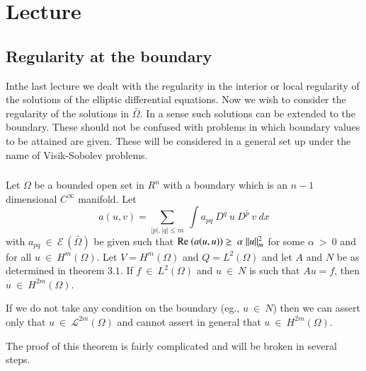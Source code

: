 
\chapter{Lecture}\label{lec15} %

\setcounter{section}{8}

\section{Regularity at the boundary}\label{lec15:sec9} %

In\pageoriginale the last lecture we dealt with the regularity in the interior or
local regularity of the solutions of the elliptic differential
equations. Now we wish to consider the regularity of the solutions in
$\bar{\Omega}$. In a sense such solutions can be extended to the
boundary. These should not be confused with problems in which boundary
values to be attained are given. These will be considered in a general
set up under the name of Visik-Sobolev problems. 

\subsection{}\label{lec15:sec9:subsec1}  %

\begin{theorem}\label{lec15:sec9:subsec1:thm9.1} %
Let $\Omega$ be a bounded open set in $R^n$ with a boundary which is
an $n-1$ dimensional $C^\infty$ manifold. Let 
$$
a(u,v) = \sum_{|p|,|q|\le m} ~\int  a_{pq} ~ D^q ~ u ~ \overline{D^p ~ v} ~ dx
$$
with $a_{pq} ~ \in ~ \mathscr{E} ~ (\bar{\Omega})$ be given
such that $\operatorname{Re}  ~ (a(u,u)) \ge ~ \alpha ~ || u ||^2_m$ for some
$\alpha ~ > ~ 0$ and for all $u ~ \in ~ H^m (\Omega)$. Let $V
= H^m (\Omega)$ and $Q = L^2 (\Omega)$ and let $A$ and $N$ be as
determined in theorem $3.1$. If $f ~ \in ~ L^2(\Omega)$ and $u
~ \in ~ N$ is such that $Au = f$, then $u ~ \in ~
H^{2m}(\Omega)$.  
\end{theorem}

\begin{remark*}%
  If we do not take any condition on the boundary (eg., $u ~ \in
  ~ N$) then we can assert only that $u ~ \in ~
  \mathscr{L}^{2m}(\Omega)$ and cannot assert in general that $u ~
  \in ~ H^{2m}(\Omega)$. 
\end{remark*}

The proof of this theorem is fairly complicated and will be broken in
several steps.

